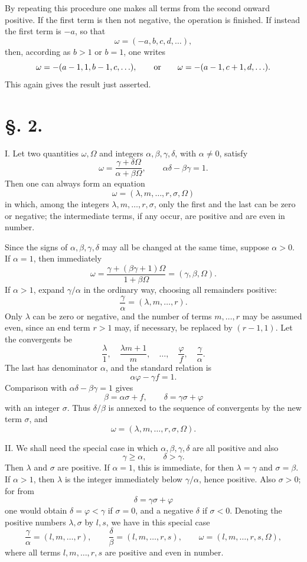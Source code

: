 \documentclass[11pt]{article}
\begin{document}
By repeating this procedure one makes all terms from the second onward positive. If the first term is then not negative, the operation is finished. If instead the first term is $-a$, so that
\[
 \omega=(-a,b,c,d,\ldots),
\]
then, according as $b>1$ or $b=1$, one writes
\[
 \omega=-(a-1,1,b-1,c,\ldots),
 \qquad\hbox{or}\qquad
 \omega=-(a-1,c+1,d,\ldots).
\]
This again gives the result just asserted.

\section*{\S. 2.}

I. Let two quantities $\omega,\Omega$ and integers $\alpha,\beta,\gamma,\delta$, with $\alpha\ne0$, satisfy
\[
 \omega=\frac{\gamma+\delta\Omega}{\alpha+\beta\Omega},
 \qquad
 \alpha\delta-\beta\gamma=1.
\]
Then one can always form an equation
\[
 \omega=(\lambda,m,\ldots,r,\sigma,
\Omega)
\]
in which, among the integers $\lambda,m,\ldots,r,\sigma$, only the first and the last can be zero or negative; the intermediate terms, if any occur, are positive and are even in number.

Since the signs of $\alpha,\beta,\gamma,\delta$ may all be changed at the same time, suppose $\alpha>0$. If $\alpha=1$, then immediately
\[
 \omega=\frac{\gamma+(\beta\gamma+1)\Omega}{1+\beta\Omega}
       =(\gamma,\beta,\Omega).
\]
If $\alpha>1$, expand $\gamma/\alpha$ in the ordinary way, choosing all remainders positive:
\[
 \frac{\gamma}{\alpha}=(\lambda,m,\ldots,r).
\]
Only $\lambda$ can be zero or negative, and the number of terms $m,
\ldots,r$ may be assumed even, since an end term $r>1$ may, if necessary, be replaced by $(r-1,1)$. Let the convergents be
\[
 \frac{\lambda}{1},
 \quad
 \frac{\lambda m+1}{m},
 \quad\ldots,
 \quad
 \frac{\varphi}{f},
 \quad
 \frac{\gamma}{\alpha}.
\]
The last has denominator $\alpha$, and the standard relation is
\[
 \alpha\varphi-
\gamma f=1.
\]
Comparison with $\alpha\delta-
\beta\gamma=1$ gives
\[
 \beta=\alpha\sigma+f,
 \qquad
 \delta=\gamma\sigma+\varphi
\]
with an integer $\sigma$. Thus $\delta/\beta$ is annexed to the sequence of convergents by the new term $\sigma$, and
\[
 \omega=(\lambda,m,\ldots,r,\sigma,
\Omega).
\]

II. We shall need the special case in which $\alpha,\beta,\gamma,\delta$ are all positive and also
\[
 \gamma\geq\alpha,
 \qquad
 \delta>\gamma.
\]
Then $\lambda$ and $\sigma$ are positive. If $\alpha=1$, this is immediate, for then $\lambda=\gamma$ and $\sigma=\beta$. If $\alpha>1$, then $\lambda$ is the integer immediately below $\gamma/\alpha$, hence positive. Also $\sigma>0$; for from
\[
 \delta=\gamma\sigma+\varphi
\]
one would obtain $\delta=\varphi<\gamma$ if $\sigma=0$, and a negative $\delta$ if $\sigma<0$. Denoting the positive numbers $\lambda,
\sigma$ by $l,s$, we have in this special case
\[
 \frac{\gamma}{\alpha}=(l,m,\ldots,r),
 \qquad
 \frac{\delta}{\beta}=(l,m,\ldots,r,s),
 \qquad
 \omega=(l,m,\ldots,r,s,
\Omega),
\]
where all terms $l,m,
\ldots,r,s$ are positive and even in number.
\end{document}
